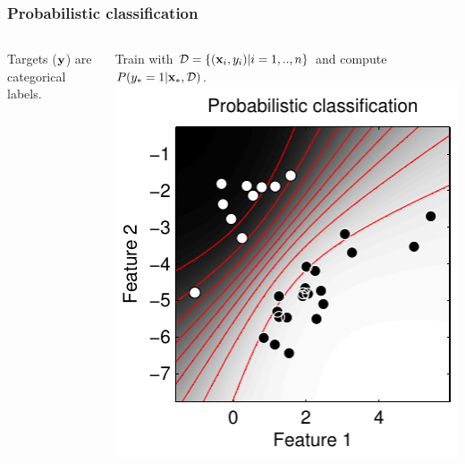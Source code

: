 \begin{frame}
\frametitle{Probabilistic classification}
\begin{columns}
Targets (${\bf y}$) are categorical labels.\par
Train with $\mathcal{D} = \{({\bf x}_i,y_i) | i=1,..,n\}$ and compute $P(y_*=1 | {\bf x}_*, \mathcal{D})$.
\includegraphics[width=\textwidth]{probabilistic_classification}
\end{columns}
\end{frame}

